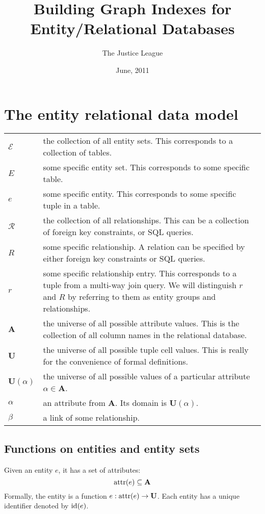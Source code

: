 \documentclass{article}
\begin{document}
\title{Building Graph Indexes for Entity/Relational Databases}
\author{The Justice League}
\date{June, 2011}
\maketitle

\section{The entity relational data model}

\begin{tabular}{|l|p{4in}|} \hline
$\mathcal{E}$ & the collection of all entity sets. This corresponds to a
collection of tables. \\
$E$ & some specific entity set.  This corresponds to some specific table.\\
$e$ & some specific entity.  This corresponds to some specific tuple in a
table. \\\hline\hline
$\mathcal{R}$ & the collection of all relationships.  This can be a collection
of foreign key constraints, or SQL queries. \\
$R$ & some specific relationship.  A relation can be specified by either
foreign key constraints or SQL queries. \\
$r$ & some specific relationship entry.  This corresponds to a tuple from a
multi-way join query. We will distinguish $r$ and $R$ by referring to them as
entity groups and relationships.\\ \hline\hline
$\mathbf{A}$ & the universe of all possible attribute values.  This is the
collection of all column names in the relational database. \\
$\mathbf{U}$ & the universe of all possible tuple cell values.  This is really
for the convenience of formal definitions. \\
$\mathbf{U}(\alpha)$ & the universe of all possible values of a particular
attribute $\alpha\in\mathbf{A}$. \\ \hline
$\alpha$ & an attribute from $\mathbf{A}$.  Its domain is
$\mathbf{U}(\alpha)$.\\
$\beta$ & a link of some relationship. \\\hline
\end{tabular}

\subsection{Functions on entities and entity sets}
Given an entity $e$, it has a set of attributes:
$$\operatorname{attr}(e)\subseteq\mathbf{A}$$
Formally, the entity is a function $e:\operatorname{attr}(e)\to\mathbf{U}$.
Each entity has a unique identifier denoted by $\operatorname{id}(e)$.
\end{document}
